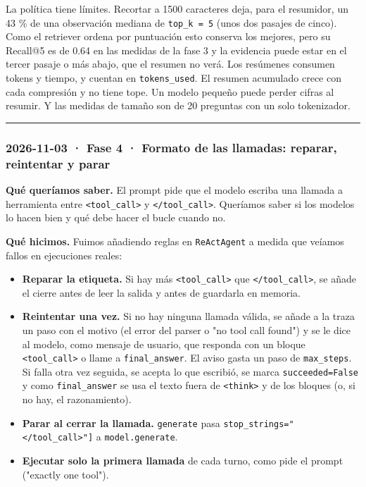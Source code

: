 La política tiene límites. Recortar a 1500 caracteres deja, para el resumidor, un 43 \% de una
observación mediana de \texttt{top\_\allowbreak{}k =\allowbreak{} 5} (unos dos pasajes de cinco). Como el retriever ordena por puntuación
esto conserva los mejores, pero su Recall@5 es de 0.64 en las medidas de la fase 3 y la evidencia puede
estar en el tercer pasaje o más abajo, que el resumen no verá. Los resúmenes consumen tokens y tiempo, y
cuentan en \texttt{tokens\_\allowbreak{}used}. El resumen acumulado crece con cada compresión y no tiene tope. Un modelo
pequeño puede perder cifras al resumir. Y las medidas de tamaño son de 20 preguntas con un solo
tokenizador.

\begin{center}\rule{0.5\linewidth}{0.5pt}\end{center}

\subsubsection{2026-11-03 · Fase 4 · Formato de las llamadas: reparar, reintentar y parar}

\textbf{Qué queríamos saber.} El prompt pide que el modelo escriba una llamada a herramienta entre
\texttt{\textless{}tool\_\allowbreak{}call\textgreater{}} y \texttt{\textless{}/\allowbreak{}tool\_\allowbreak{}call\textgreater{}}. Queríamos saber si los modelos lo hacen bien y qué debe hacer el bucle
cuando no.

\textbf{Qué hicimos.} Fuimos añadiendo reglas en \texttt{ReActAgent} a medida que veíamos fallos en ejecuciones
reales:

\begin{itemize}
\tightlist
\item
  \textbf{Reparar la etiqueta.} Si hay más \texttt{\textless{}tool\_\allowbreak{}call\textgreater{}} que \texttt{\textless{}/\allowbreak{}tool\_\allowbreak{}call\textgreater{}}, se añade el cierre antes de
  leer la salida y antes de guardarla en memoria.
\item
  \textbf{Reintentar una vez.} Si no hay ninguna llamada válida, se añade a la traza un paso con el motivo
  (el error del parser o "no tool call found") y se le dice al modelo, como mensaje de usuario, que
  responda con un bloque \texttt{\textless{}tool\_\allowbreak{}call\textgreater{}} o llame a \texttt{final\_\allowbreak{}answer}. El aviso gasta un paso de
  \texttt{max\_\allowbreak{}steps}. Si falla otra vez seguida, se acepta lo que escribió, se marca \texttt{succeeded=\allowbreak{}False} y como
  \texttt{final\_\allowbreak{}answer} se usa el texto fuera de \texttt{\textless{}think\textgreater{}} y de los bloques (o, si no hay, el razonamiento).
\item
  \textbf{Parar al cerrar la llamada.} \texttt{generate} pasa \texttt{stop\_\allowbreak{}strings=\allowbreak{}{[}"\textless{}/\allowbreak{}tool\_\allowbreak{}call\textgreater{}"{]}} a
  \texttt{model.generate}.
\item
  \textbf{Ejecutar solo la primera llamada} de cada turno, como pide el prompt ("exactly one tool").
\end{itemize}

